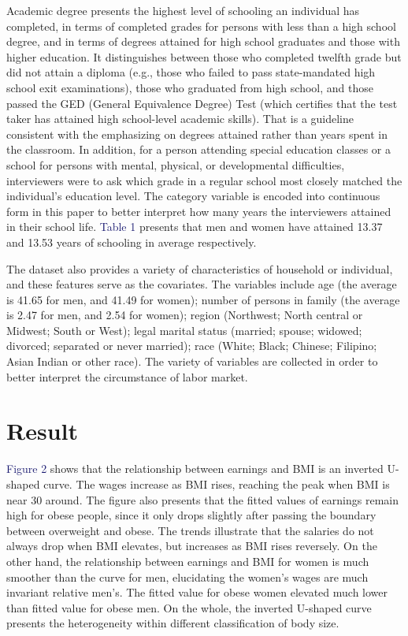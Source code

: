 \documentclass{article}
\begin{document}
\par
\setlength{\parindent}{2em}
Academic degree presents the highest level of schooling an individual has completed, in terms of completed grades for persons with less than a high school degree, and in terms of degrees attained for high school graduates and those with higher education. It distinguishes between those who completed twelfth grade but did not attain a diploma (e.g., those who failed to pass state-mandated high school exit examinations), those who graduated from high school, and those passed the GED (General Equivalence Degree) Test (which certifies that the test taker has attained high school-level academic skills). That is a guideline consistent with the emphasizing on degrees attained rather than years spent in the classroom. In addition, for a person attending special education classes or a school for persons with mental, physical, or developmental difficulties, interviewers were to ask which grade in a regular school most closely matched the individual's education level. The category variable is encoded into continuous form in this paper to better interpret how many years the interviewers attained in their school life. \textcolor{MidnightBlue}{Table 1} presents that men and women have attained 13.37 and 13.53 years of schooling in average respectively.
\par
\setlength{\parindent}{2em}
The dataset also provides a variety of characteristics of household or individual, and these features serve as the covariates. The variables include age (the average is 41.65 for men, and 41.49 for women); number of persons in family (the average is 2.47 for men, and 2.54 for women); region (Northwest; North central or Midwest; South or West); legal marital status (married; spouse; widowed; divorced; separated or never married); race (White; Black; Chinese; Filipino; Asian Indian or other race). The variety of variables are collected in order to better interpret the circumstance of labor market. 

\section{Result}

\par
\setlength{\parindent}{2em}
\textcolor{MidnightBlue}{Figure 2} shows that the relationship between earnings and BMI is an inverted U-shaped curve. The wages increase as BMI rises, reaching the peak when BMI is near 30 around. The figure also presents that the fitted values of earnings remain high for obese people, since it only drops slightly after passing the boundary between overweight and obese. The trends illustrate that the salaries do not always drop when BMI elevates, but increases as BMI rises reversely. On the other hand, the relationship between earnings and BMI for women is much smoother than the curve for men, elucidating the women’s wages are much invariant relative men’s. The fitted value for obese women elevated much lower than fitted value for obese men. On the whole, the inverted U-shaped curve presents the heterogeneity within different classification of body size.
\end{document}
